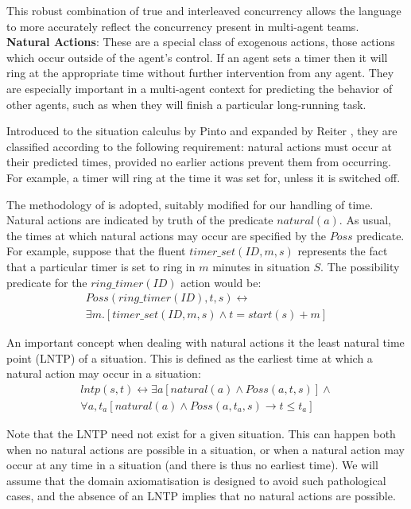 \documentclass[letterpaper]{article}
\begin{document}
This robust combination of true and interleaved concurrency allows
the language to more accurately reflect the concurrency present in
multi-agent teams.
\\

\textbf{Natural Actions}: These are a special class of exogenous actions, those
actions which occur
outside of the agent's control.
If an agent sets a timer then it will
ring at the appropriate time without further intervention from any agent.  They
are especially important in a multi-agent context for predicting the
behavior of other agents, such as when they will finish a particular
long-running task.

Introduced to the situation
calculus by Pinto \cite{pinto94temporal} and expanded by Reiter \cite{reiter96sc_nat_conc},
they are classified according to the following requirement: natural
actions must occur at their predicted times, provided no earlier actions
prevent them from occurring. For example, a timer will ring at the
time it was set for, unless it is switched off.

The methodology of \cite{reiter96sc_nat_conc} is adopted, suitably
modified for our handling of time. Natural actions are indicated by
truth of the predicate $natural(a)$. As usual, the times at which
natural actions may occur are specified by the $Poss$ predicate.
For example, suppose that the fluent $timer\_set(ID,m,s)$ represents
the fact that a particular timer is set to ring in $m$ minutes in
situation $S$. The possibility predicate for the $ring\_timer(ID)$
action would be:
\begin{multline}
Poss(ring\_timer(ID),t,s)\leftrightarrow\\
\exists m.\left[timer\_set(ID,m,s)\wedge t=start(s)+m\right]
\end{multline}

An important concept when dealing with natural actions it the least
natural time point (LNTP) of a situation. This is defined as the earliest
time at which a natural action may occur in a situation:
\begin{multline}
lntp(s,t)\leftrightarrow \exists a\left[natural(a)\wedge Poss(a,t,s)\right]\wedge\\
\forall a,t_{a}\left[natural(a)\wedge Poss(a,t_{a},s)\rightarrow t\leq t_{a}\right]
\end{multline}

Note that the LNTP need not exist for a given situation. This can
happen both when no natural actions are possible in a situation, or
when a natural action may occur at any time in a situation (and there
is thus no earliest time). We will assume that the domain axiomatisation
is designed to avoid such pathological cases, and the absence of an
LNTP implies that no natural actions are possible.
\end{document}
